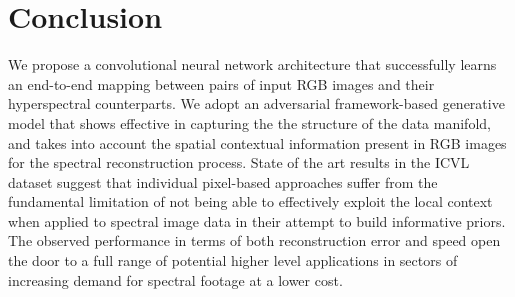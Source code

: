 \documentclass{bmvc2k}
\begin{document}
\section{Conclusion}
\label{sec:conclusion}

We propose a convolutional neural network architecture that successfully learns an end-to-end mapping between pairs of input RGB images and their hyperspectral counterparts.
We adopt an adversarial framework-based generative model that shows effective in capturing the the structure of the data manifold, and takes into account the spatial contextual information present in RGB images for the spectral reconstruction process. 
State of the art results in the ICVL dataset suggest that individual pixel-based approaches suffer from the fundamental limitation of not being able to effectively exploit the local context when applied to spectral image data in their attempt to build informative priors. 
The observed performance in terms of both reconstruction error and speed open the door to a full range of potential higher level applications in sectors of increasing demand for spectral footage at a lower cost.



\end{document}
